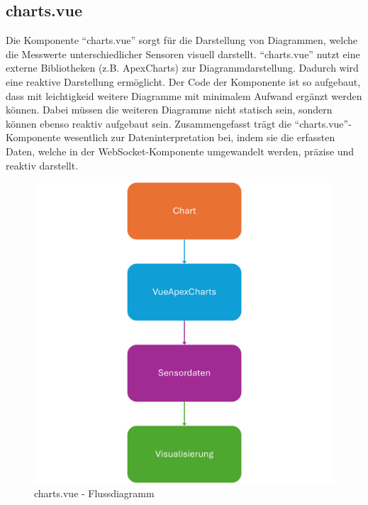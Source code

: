 \subsection{charts.vue}
\label{subsec:frontend_charts.vue}
Die Komponente ``charts.vue'' sorgt für die Darstellung von Diagrammen,
welche die Messwerte unterschiedlicher Sensoren visuell darstellt.
%
``charts.vue'' nutzt eine externe Bibliotheken (z.B. ApexCharts) zur Diagrammdarstellung.
Dadurch wird eine reaktive Darstellung ermöglicht.
%
Der Code der Komponente ist so aufgebaut, dass mit leichtigkeid weitere Diagramme
mit minimalem Aufwand ergänzt werden können. 
Dabei müssen die weiteren Diagramme nicht statisch sein, 
sondern können ebenso reaktiv aufgebaut sein.
%
Zusammengefasst trägt die ``charts.vue''-Komponente wesentlich zur 
Dateninterpretation bei, indem sie die erfassten Daten,
welche in der WebSocket-Komponente umgewandelt werden, präzise und reaktiv darstellt.

\begin{figure}[H]
  \includegraphics[width=\textwidth, center]{img/Charts_FD.png}
  \caption{charts.vue - Flussdiagramm}
  \label{fig:charts_Flowchart}
\end{figure}

